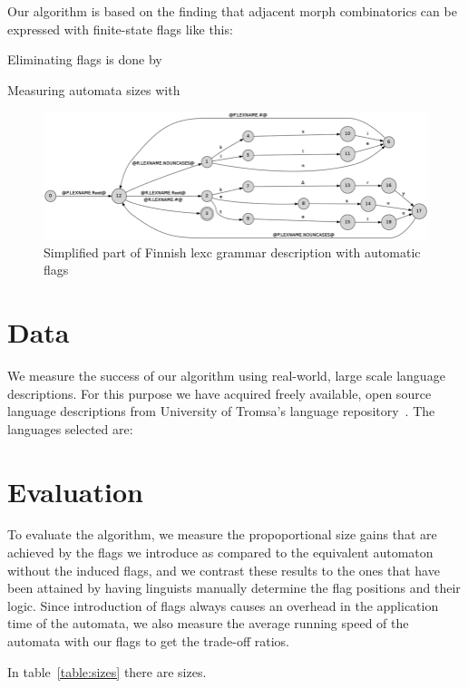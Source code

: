 \documentclass[11pt]{article}
\begin{document}
Our algorithm is based on the finding that adjacent morph combinatorics can
be expressed with finite-state flags like this:

Eliminating flags is done by

Measuring automata sizes with

\begin{figure}
    \includegraphics[width=\textwidth]{transducer.png}
     \caption{Simplified part of Finnish lexc grammar description with automatic flags
     \label{fig:lexc-fin-flag}}
\end{figure}

\section{Data}
\label{sec:data}

We measure the success of our algorithm using real-world, large scale language
descriptions. For this purpose we have acquired freely available, open source
language descriptions from University of Tromsa's language 
repository~\cite{moshagen2013building}. The languages selected are:

\section{Evaluation}
\label{sec:evaluation}

To evaluate the algorithm, we measure the propoportional size gains that are
achieved by the flags we introduce as compared to the equivalent automaton
without the induced flags, and we contrast these results to the ones that have
been attained by having linguists manually determine the flag positions and
their logic. Since introduction of flags always causes an overhead in the
application time of the automata, we also measure the average running speed
of the automata with our flags to get the trade-off ratios.

In table~\ref{table:sizes} there are sizes.
\end{document}
